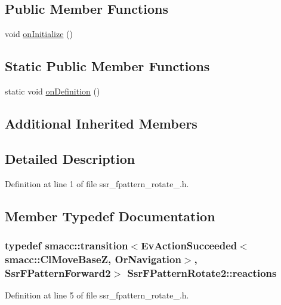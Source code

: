 \subsection*{Public Member Functions}
\begin{DoxyCompactItemize}
\item 
void \hyperlink{structSsrFPatternRotate2_af062537a9565259e197c1241c9c9d9b0}{on\+Initialize} ()
\end{DoxyCompactItemize}
\subsection*{Static Public Member Functions}
\begin{DoxyCompactItemize}
\item 
static void \hyperlink{structSsrFPatternRotate2_a4140f75a6189da0833fd5e6100c5193d}{on\+Definition} ()
\end{DoxyCompactItemize}
\subsection*{Additional Inherited Members}


\subsection{Detailed Description}


Definition at line 1 of file ssr\+\_\+fpattern\+\_\+rotate\+\_.\+h.



\subsection{Member Typedef Documentation}
\subsubsection[{\texorpdfstring{reactions}{reactions}}]{\setlength{\rightskip}{0pt plus 5cm}typedef {\bf smacc\+::transition}$<$Ev\+Action\+Succeeded$<${\bf smacc\+::\+Cl\+Move\+BaseZ}, Or\+Navigation$>$, {\bf Ssr\+F\+Pattern\+Forward2}$>$ {\bf Ssr\+F\+Pattern\+Rotate2\+::reactions}}\hypertarget{structSsrFPatternRotate2_a7415aa59cf273cef36f62fe1a796bb48}{}\label{structSsrFPatternRotate2_a7415aa59cf273cef36f62fe1a796bb48}


Definition at line 5 of file ssr\+\_\+fpattern\+\_\+rotate\+\_.\+h.




